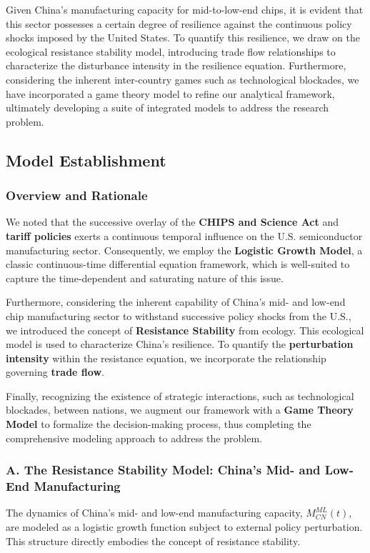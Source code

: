 \documentclass[12pt]{article}
\begin{document}
Given China's manufacturing capacity for mid-to-low-end chips, it is evident that this sector possesses a certain degree of resilience against the continuous policy shocks imposed by the United States. To quantify this resilience, we draw on the ecological resistance stability model, introducing trade flow relationships to characterize the disturbance intensity in the resilience equation. Furthermore, considering the inherent inter-country games such as technological blockades, we have incorporated a game theory model to refine our analytical framework, ultimately developing a suite of integrated models to address the research problem.

\subsection{Model Establishment}

\subsubsection{Overview and Rationale}
We noted that the successive overlay of the \textbf{CHIPS and Science Act} and \textbf{tariff policies} exerts a continuous temporal influence on the U.S. semiconductor manufacturing sector. Consequently, we employ the \textbf{Logistic Growth Model}, a classic continuous-time differential equation framework, which is well-suited to capture the time-dependent and saturating nature of this issue.

Furthermore, considering the inherent capability of China's mid- and low-end chip manufacturing sector to withstand successive policy shocks from the U.S., we introduced the concept of \textbf{Resistance Stability} from ecology. This ecological model is used to characterize China's resilience. To quantify the \textbf{perturbation intensity} within the resistance equation, we incorporate the relationship governing \textbf{trade flow}.

Finally, recognizing the existence of strategic interactions, such as technological blockades, between nations, we augment our framework with a \textbf{Game Theory Model} to formalize the decision-making process, thus completing the comprehensive modeling approach to address the problem.

\subsubsection{A. The Resistance Stability Model: China's Mid- and Low-End Manufacturing}
The dynamics of China's mid- and low-end manufacturing capacity, $M_{CN}^{ML}(t)$, are modeled as a logistic growth function subject to external policy perturbation. This structure directly embodies the concept of resistance stability.
\end{document}
